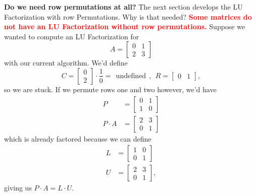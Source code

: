 \vspace*{.3cm}

\textbf{Do we need row permutations at all?} 
The next section develops the LU Factorization with row Permutations. Why is that needed? \textcolor{red}{\bf Some matrices do not have an LU Factorization without row permutations.} Suppose we wanted to compute an LU Factorization for 
$$A = \begin{bmatrix}0 & 1\\ 2 & 3 \end{bmatrix} $$
with our current algorithm.  We'd define
$$C= \left[\begin{array}{r} 0 \\2 \end{array} \right] \cdot \frac{1}{0} =~~\text{undefined}~~ ,~~R=\left[\begin{array}{rr} 0 & 1\end{array} \right], $$
so we are stuck. If we permute rows one and two however, we'd have 
\begin{align*}
P&=  \begin{bmatrix}0 & 1\\ 1 & 0 \end{bmatrix}\\
P \cdot A &= \begin{bmatrix} 2 & 3 \\ 0 & 1\end{bmatrix}
\end{align*}
which is already factored because we can define 
\begin{align*}
L&=  \begin{bmatrix}1 & 0\\ 0 & 1 \end{bmatrix}\\
U  &= \begin{bmatrix} 2 & 3 \\ 0 & 1\end{bmatrix},
\end{align*}
giving us $P \cdot A = L \cdot U.$
\vspace*{0.5cm}


